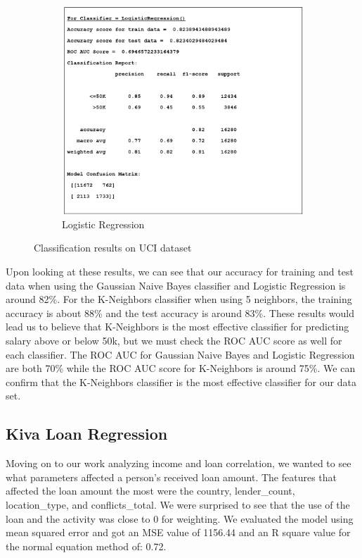 \documentclass{article}
\begin{document}
\begin{figure}
\begin{subfigure}[b]{0.5\textwidth}
  \end{subfigure}
  \hfill
  \begin{subfigure}[b]{0.5\textwidth}
      \centering
      \includegraphics[width=\textwidth]{lgr_uci.PNG}
      \caption{Logistic Regression}
      \label{fig:five over x}
  \end{subfigure}
     \caption{Classification results on UCI dataset}
     \label{fig:three graphs}
\end{figure}

Upon looking at these results, we can see that our accuracy for training and test data when using the Gaussian Naive Bayes classifier and Logistic Regression is around 82\%. For the K-Neighbors classifier when using 5 neighbors, the training accuracy is about 88\% and the test accuracy is around 83\%. These results would lead us to believe that K-Neighbors is the most effective classifier for predicting salary above or below 50k, but we must check the ROC AUC score as well for each classifier. The ROC AUC for Gaussian Naive Bayes and Logistic Regression are both 70\% while the ROC AUC score for K-Neighbors is around 75\%. We can confirm that the K-Neighbors classifier is the most effective classifier for our data set. 

\subsection{Kiva Loan Regression}

Moving on to our work analyzing income and loan correlation, we wanted to see what parameters affected a person's received loan amount. The features that affected the loan amount the most were the country, lender\_count, location\_type, and conflicts\_total. We were surprised to see that the use of the loan and the activity was close to 0 for weighting. We evaluated the model using mean squared error and got an MSE value of 1156.44 and an R square value for the normal equation method of: 0.72. 
\end{document}
